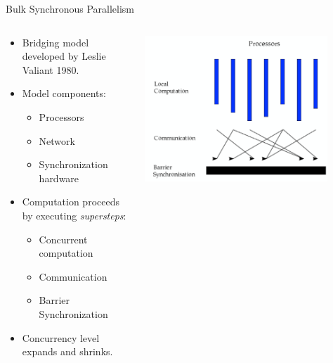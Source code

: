 \begin{frame}{Bulk Synchronous Parallelism}

\begin{columns}
\begin{column}{0.5\textwidth}
  \begin{itemize}
  \item Bridging model developed by Leslie Valiant 1980.
  \item Model components:
      \begin{itemize}
      \item Processors
      \item Network
      \item Synchronization hardware
      \end{itemize}
  \item Computation proceeds by executing \textit{supersteps}:
      \begin{itemize}
      \item Concurrent computation
      \item Communication
      \item Barrier Synchronization
      \end{itemize}
  \item Concurrency level expands and shrinks. 
  \end{itemize}
\end{column}
\begin{column}{0.5\textwidth}  %
    \begin{center}
     \includegraphics[width=0.85\textwidth]{img/BSP.png}
     \end{center}
\end{column}
\end{columns}
    
\end{frame}

